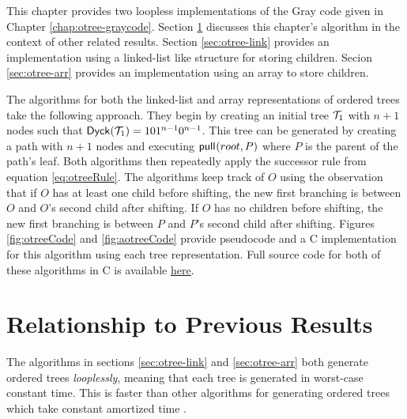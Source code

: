 This chapter provides two loopless implementations of the Gray code given in Chapter \ref{chap:otree-graycode}.  
Section \ref{sec:relationship-loopless} discusses this chapter's algorithm in the context of other related results.  Section \ref{sec:otree-link} provides an implementation using a linked-list like structure for storing children.  Secion \ref{sec:otree-arr} provides an implementation using an array to store children.  

The algorithms for both the linked-list and array representations of ordered trees take the following approach.  They begin by creating an initial tree $\mathcal{T}_1$ with $n+1$ nodes such that $\mathsf{Dyck}{(\mathcal{T}_1)}=101^{n-1}0^{n-1}$.  This tree can be generated by creating a path with $n+1$ nodes and executing $\mathsf{pull}_{}(root,P)$ where $P$ is the parent of the path's leaf. Both algorithms then repeatedly apply the successor rule from equation \ref{eq:otreeRule}.  The algorithms keep track of $O$ using the observation that if $O$ has at least one child before shifting, the new first branching is between $O$ and $O$'s second child after shifting.  If $O$ has no children before shifting, the new first branching is between $P$ and $P$'s second child after shifting. Figures \ref{fig:otreeCode} and \ref{fig:aotreeCode} provide pseudocode and a C implementation for this algorithm using each tree representation.  Full source code for both of these algorithms in C is available \href{https://github.com/pwl45/ordered-trees/tree/main/otree}{here}.

\section{Relationship to Previous Results}\label{sec:relationship-loopless}
The algorithms in sections \ref{sec:otree-link} and \ref{sec:otree-arr} both generate ordered trees \emph{looplessly}, meaning that each tree is generated in worst-case constant time.  This is faster than other algorithms for generating ordered trees which take constant amortized time \cite{parque2021efficient} \cite{er1985lexotrees} \cite{zaks1980lexotrees} \cite{skarbek1988pointerotrees}. 



